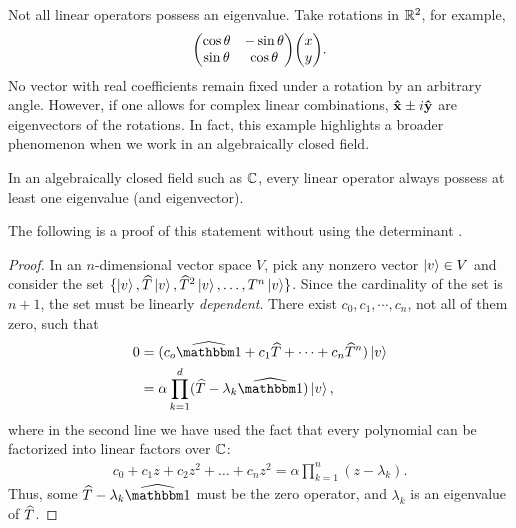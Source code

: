 Not all linear operators possess an eigenvalue. Take rotations in $\mathbb R^2$, for example,
\begin{align}
	\mqty(\cos\theta & -\sin\theta \\ \sin\theta & \cos\theta)\mqty(x \\ y).
\end{align}
No vector with real coefficients remain fixed under a rotation by an arbitrary angle. However, if one allows for complex linear combinations, ${\bf \hat{x}}\pm i{\bf \hat{y}}$ are eigenvectors of the rotations. In fact, this example highlights a broader phenomenon when we work in an algebraically closed field.


\begin{theorem}\label{thm:eigenvalue-exists}
	In an algebraically closed field such as $\mathbb C$, every linear operator always possess at least one eigenvalue (and eigenvector).
\end{theorem}
\noindent The following is a proof of this statement without using the determinant \cite{axler}.
\begin{proof}
	In an $n$-dimensional vector space $V$,
	pick any nonzero vector $\ket{v}\in V$ and consider the set $\{\ket{v},\widehat{T}\ket{v},\widehat{T}^2 \ket{v},\dots,T^n \ket{v}\}$. Since the cardinality of the set is $n+1$, the set must be linearly \emph{dependent}. There exist $c_0,c_1,\cdots,c_n$, not all of them zero, such that
	\begin{align}
		0 &= (c_o\op\id + c_1\op T + \cdots + c_n\op T^n)\ket{v} \\
		&= \alpha \prod_{k=1}^d (\op T-\lambda_k \op\id) \ket{v},
	\end{align}
	where in the second line we have used the fact that every polynomial can be factorized into linear factors over $\mathbb C$:
	\begin{align}
		c_0 + c_1z + c_2z^2 +\dots+c_nz^2 = \alpha \prod_{k=1}^n(z-\lambda_k).
	\end{align}
	Thus, some $\op T -\lambda_k\op\id$ must be the zero operator, and $\lambda_k$ is an eigenvalue of $\widehat{T}$.
\end{proof}


